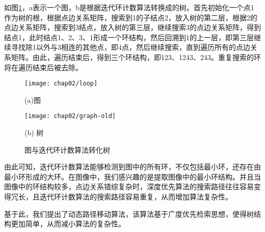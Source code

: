 如图\ref{fig:graph-tree}，a表示一个图，b是根据迭代环计数算法转换成的树。首先初始化一个点1作为树的根，根据点边关系矩阵，搜索到1的子结点2，放入树的第二层，根据2的点边关系矩阵，搜索到3结点，放入树的第三层，继续搜索3的点边关系矩阵，得到结点1，此时结点1、2、3、1形成一个环结构，然后回溯到1的上一层，即第三层继续寻找除1以外与3相连的其他点，即4点，然后继续搜索，直到遍历所有的点边关系矩阵。由此，遍历结束后，得到三个环结构，即123、1243、243。重复搜索的环将在遍历结束后被去除。
\begin{figure}[H]
\centering
  \begin{minipage}[b]{0.48\textwidth} 
      \centering 
      \texttt{[image: chap02/loop]}
        \centerline{(a)图}\medskip
    \end{minipage}
  \begin{minipage}[b]{0.48\textwidth}
    \centering
    \texttt{[image: chap02/graph-old]}
      \centerline{(b) 树}\medskip
  \end{minipage}
\caption{图与迭代环计数算法转化树}
\label{fig:graph-tree}
\end{figure}

由此可知，迭代环计数算法能够检测到图中的所有环，不仅包括最小环，还存在由最小环形成的大环。在图像中，我们感兴趣的是提取图像中的最小环结构。并且当图像中的环结构较多，点边关系错综复杂时，深度优先算法的搜索路径往往容易变得冗长，且迭代环计数算法的搜索路径容易重复，从而增加算法复杂性。

基于此，我们提出了动态路径移动算法，该算法基于广度优先检索思想，使得树结构更加简单，从而减小算法的复杂性。

